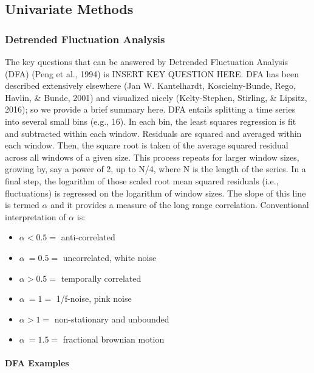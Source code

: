 \documentclass[
  english,
  man]{apa6}
\providecommand{\tightlist}{%
  \setlength{\itemsep}{0pt}\setlength{\parskip}{0pt}}
\let\oldparagraph\paragraph
\renewcommand{\paragraph}[1]{\oldparagraph{#1}\mbox{}}
\begin{document}
\hypertarget{univariate-methods}{%
\subsection{Univariate Methods}\label{univariate-methods}}

\hypertarget{detrended-fluctuation-analysis}{%
\subsubsection{Detrended Fluctuation Analysis}\label{detrended-fluctuation-analysis}}

The key questions that can be answered by Detrended Fluctuation Analysis
(DFA) (Peng et al., 1994) is INSERT KEY QUESTION HERE. DFA
has been described extensively elsewhere
(Jan W. Kantelhardt, Koscielny-Bunde, Rego, Havlin, \& Bunde, 2001) and visualized nicely
(Kelty-Stephen, Stirling, \& Lipsitz, 2016); so we provide a
brief summary here. DFA entails splitting a time series into several
small bins (e.g., 16). In each bin, the least squares regression is fit
and subtracted within each window. Residuals are squared and averaged
within each window. Then, the square root is taken of the average
squared residual across all windows of a given size. This process
repeats for larger window sizes, growing by, say a power of 2, up to
N/4, where N is the length of the series. In a final step, the logarithm
of those scaled root mean squared residuals (i.e., fluctuations) is
regressed on the logarithm of window sizes. The slope of this line is
termed \(\alpha\) and it provides a measure of the long range correlation.
Conventional interpretation of \(\alpha\) is:

\begin{itemize}
\tightlist
\item
  \(\alpha < 0.5 =\) anti-correlated
\item
  \(\alpha ~= 0.5 =\) uncorrelated, white noise
\item
  \(\alpha > 0.5 =\) temporally correlated
\item
  \(\alpha ~= 1 =\) 1/f-noise, pink noise
\item
  \(\alpha > 1 =\) non-stationary and unbounded
\item
  \(\alpha ~= 1.5 =\) fractional brownian motion
\end{itemize}

\hypertarget{dfa-examples}{%
\paragraph{DFA Examples}\label{dfa-examples}}
\end{document}
